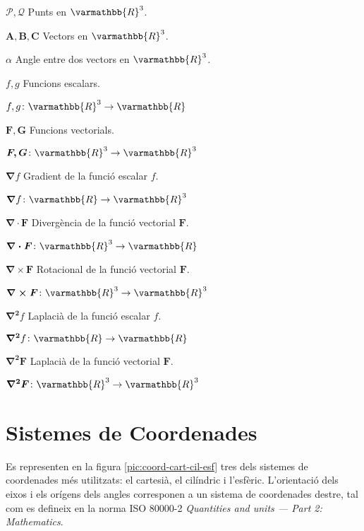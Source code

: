 \documentclass[catalan,a4paper,twoside,11pt]{article}
\begin{document}
\begin{list}{}
   \item[$\mathscr{P}, \mathscr{Q}$] Punts en $\varmathbb{R}^3$.

   \item[$\boldsymbol{A,B,C}$] Vectors en $\varmathbb{R}^3$.

   \item[$\alpha$] Angle entre dos vectors en $\varmathbb{R}^3$.

   \item[$f,g$] Funcions escalars.

   $f,g \colon \varmathbb{R}^3\rightarrow\varmathbb{R}$

   \item[$\boldsymbol{F,G}$] Funcions vectorials.

   $\boldsymbol{F,G}\colon\varmathbb{R}^3\rightarrow\varmathbb{R}^3$

   \item[$\boldsymbol{\nabla}f$] Gradient de la funció escalar $f$.

   $\boldsymbol{\nabla}f\colon\varmathbb{R}\rightarrow\varmathbb{R}^3$

   \item[$\boldsymbol{\nabla\cdot F}$] Divergència de la funció vectorial $\boldsymbol{F}$.

   $\boldsymbol{\nabla\cdot F}\colon \varmathbb{R}^3\rightarrow\varmathbb{R}$

   \item[$\boldsymbol{\nabla\times F}$] Rotacional de la funció vectorial $\boldsymbol{F}$.

   $\boldsymbol{\nabla\times F}\colon   \varmathbb{R}^3\rightarrow\varmathbb{R}^3$

   \item[$\boldsymbol{\nabla^2}f$] Laplacià de la funció escalar $f$.

   $\boldsymbol{\nabla^2}f\colon \varmathbb{R}\rightarrow\varmathbb{R}$

   \item[$\boldsymbol{\nabla^2F}$] Laplacià de la funció vectorial $\boldsymbol{F}$.

    $\boldsymbol{\nabla^2F}\colon \varmathbb{R}^3\rightarrow\varmathbb{R}^3$
\end{list}


\section{Sistemes de Coordenades}

Es representen en la figura \vref{pic:coord-cart-cil-esf} tres dels
sistemes de coordenades més utilitzats: el cartesià, el
cilíndric i l'esfèric. L'orientació dels eixos i els orígens dels angles corresponen a un sistema de coordenades destre, tal com es defineix en la norma ISO 80000-2 \textit{Quantities and units --- Part 2: Mathematics}.
\end{document}
